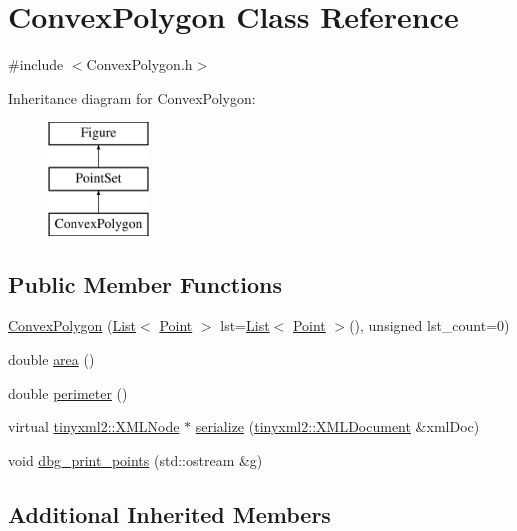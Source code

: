 \hypertarget{class_convex_polygon}{}\section{Convex\+Polygon Class Reference}
\label{class_convex_polygon}


{\ttfamily \#include $<$Convex\+Polygon.\+h$>$}

Inheritance diagram for Convex\+Polygon\+:\begin{figure}[H]
\begin{center}
\leavevmode
\includegraphics[height=3.000000cm]{class_convex_polygon}
\end{center}
\end{figure}
\subsection*{Public Member Functions}
\begin{DoxyCompactItemize}
\item 
\hyperlink{class_convex_polygon_aac5d610baed71675c395b4ef0898dfd2}{Convex\+Polygon} (\hyperlink{class_list}{List}$<$ \hyperlink{class_point}{Point} $>$ lst=\hyperlink{class_list}{List}$<$ \hyperlink{class_point}{Point} $>$(), unsigned lst\+\_\+count=0)
\item 
double \hyperlink{class_convex_polygon_a4d8ca9c4d454308dcd95ae9f9dee2688}{area} ()
\item 
double \hyperlink{class_convex_polygon_ac8e11403c36adb4ac51b6c169257b605}{perimeter} ()
\item 
virtual \hyperlink{classtinyxml2_1_1_x_m_l_node}{tinyxml2\+::\+X\+M\+L\+Node} $\ast$ \hyperlink{class_convex_polygon_ab7cfd51933dd7a3bf821056c292ca62c}{serialize} (\hyperlink{classtinyxml2_1_1_x_m_l_document}{tinyxml2\+::\+X\+M\+L\+Document} \&xml\+Doc)
\item 
void \hyperlink{class_convex_polygon_a6956c62f285204cec995cd0c3e7ed852}{dbg\+\_\+print\+\_\+points} (std\+::ostream \&g)
\end{DoxyCompactItemize}
\subsection*{Additional Inherited Members}



